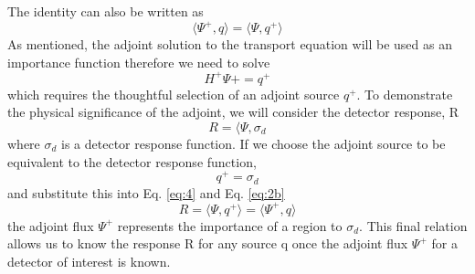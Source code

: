 The identity can also be written as
\begin{equation} \label{eq:2b}
		\langle \Psi^{+} , q \rangle =
		\langle \Psi, q^{+} \rangle
\end{equation}
As mentioned, the adjoint solution to the transport
equation will be used as an importance function therefore we need to solve
\begin{equation} \label{eq:3}
		H^{+}\Psi{+} = q^{+}
\end{equation}
which requires the thoughtful selection of an adjoint source $q^{+}$.
To demonstrate the physical significance of the adjoint, we will consider the
detector response, R
\begin{equation} \label{eq:4}
		R = \langle \Psi, \sigma_{d}
\end{equation}
where $\sigma_{d}$ is a detector response function.
If we choose the adjoint source to be equivalent to the detector response
function,
\begin{equation} \label{eq:5}
		q^{+} = \sigma_{d}
\end{equation}
and substitute this into Eq. \ref{eq:4} and Eq. \ref{eq:2b} 
\begin{equation}
		R = \langle \Psi, q^{+} \rangle = \langle \Psi^{+}, q \rangle
\end{equation}
the adjoint flux $\Psi^{+}$ represents the importance of a region to
$\sigma_{d}$.
This final relation allows us to know the response R for any source q once the
adjoint flux $\Psi^{+}$ for a detector of interest is known.

